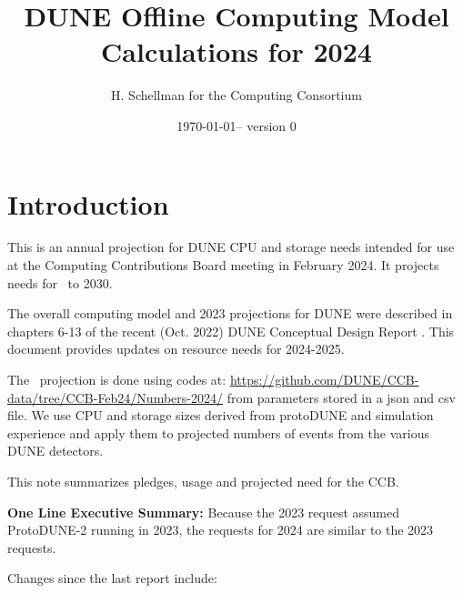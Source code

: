 \documentclass[12pt]{article}
\title{DUNE Offline Computing Model Calculations for 2024}
\author{H. Schellman for the Computing Consortium}
\date{\today -- version 0}
\begin{document}
\makeatletter
{}
\makeatother
\newcommand{\csvautotabularright}[2][]{\csvloop{autotabularright={#2},#1}}

\maketitle



\section{Introduction}

This is an annual projection for DUNE CPU and storage needs intended for use at the Computing Contributions Board meeting in February 2024. It projects needs for \ThisYear\ to 2030. 

The overall computing model  and 2023 projections for DUNE were described in chapters 6-13 of the recent (Oct. 2022) DUNE Conceptual Design Report \cite{DUNE:2022fcw}.   This document provides updates on resource needs for 2024-2025. 

The \ThisYear\ projection is done using codes at: \href{https://github.com/DUNE/CCB-data/tree/CCB-Feb24/Numbers-2024/}{https://github.com/DUNE/CCB-data/tree/CCB-Feb24/Numbers-2024/} from parameters stored in a json and csv file. We use CPU and storage sizes derived from protoDUNE and simulation experience and apply them to projected numbers of events from the various DUNE detectors. 

This note summarizes pledges, usage and projected need for the CCB.

{\bf One Line Executive Summary:} Because the 2023 request assumed ProtoDUNE-2 running in 2023, the requests for 2024 are similar to the 2023 requests.





Changes since the last report \cite{CCB2023Report, CCB2023Minutes} include:
\end{document}
